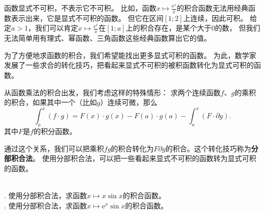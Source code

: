 \documentclass[12pt,UTF8]{ctexbook}
\begin{document}
函数显式不可积，不表示它不可积。
比如，函数$x\mapsto \frac{\mathrm{e}^x}{x}$的积合函数无法用经典函数表示出来，它是显式不可积的函数。
但它在区间$[1;2]$上连续，因此可积。
给定$a>1$，我们可以肯定$x\mapsto \frac{\mathrm{e}^x}{x}$在$[1; a]$上的积合存在，是某个大于$0$的数，
但我们无法简单用有理式、幂函数、三角函数这些经典函数算出它的值。

为了方便地求函数的积合，我们希望能找出更多显式可积的函数。
为此，数学家发展了一些求合的转化技巧，把看起来显式不可积的被积函数转化为显式可积的函数。

从函数乘法的积合出发，我们考虑这样的特殊情形：
求两个连续函数$f$、$g$的乘积的积合，如果其中一个（比如$g$）连续可微，那么
$$ \int_a^x (f \cdot g) = F(x)\cdot g(x) - F(a)\cdot g(a) - \int_a^x (F \cdot \partial g). $$
其中$F$是$f$的积分函数。

通过这个关系，我们可以把乘积$fg$的积合转化为$F\partial g$的积合。这个转化技巧称为\textbf{分部积合法}。
使用分部积合法，可以把一些看起来显式不可积的函数转为显式可积的函数。

\begin{et}
    \mbox{} \\
    . 使用分部积合法，求函数$x\mapsto x \sin{x}$的积合函数。\\
    . 使用分部积合法，求函数$x\mapsto \mathrm{e}^x \sin{x}$的积合函数。\\
\end{et}
\end{document}

